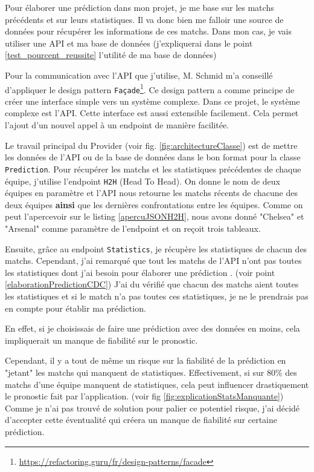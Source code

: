 \documentclass[a4paper,14pt]{extarticle}
\begin{document}
{Pour élaborer une prédiction dans mon projet, je me base sur les matchs précédents et sur leurs statistiques. Il va donc bien me falloir une source de données pour récupérer les informations de ces matchs. Dans mon cas, je vais utiliser une API et ma base de données (j'expliquerai dans le point \ref{test_pourcent_reussite} l'utilité de ma base de données)

Pour la communication avec l'API que j'utilise, M. Schmid m'a conseillé d'appliquer le design pattern \texttt{Façade}\footnote{\url{https://refactoring.guru/fr/design-patterns/facade}}. Ce design pattern a comme principe de créer une interface simple vers un système complexe. Dans ce projet, le système complexe est l'API. Cette interface est aussi extensible facilement. Cela permet l'ajout d'un nouvel appel à un endpoint de manière facilitée. 

Le travail principal du Provider (voir fig. \ref{fig:architectureClasse}) est de mettre les données de l'API ou de la base de données dans le bon format pour la classe \texttt{Prediction}.
Pour récupérer les matchs et les statistiques précédentes de chaque équipe, j'utilise l'endpoint \texttt{H2H} (Head To Head). On donne le nom de deux équipes en paramètre et l'API nous retourne les matchs récents de chacune des deux équipes \textbf{ainsi} que les dernières confrontations entre les équipes. 
Comme on peut l'apercevoir sur le listing \ref{apercuJSONH2H}, nous avons donné "Chelsea" et "Arsenal" comme paramètre de l'endpoint et on reçoit trois tableaux.

Ensuite, grâce au endpoint \texttt{Statistics}, je récupère les statistiques de chacun des matchs. Cependant, j'ai remarqué que tout les matchs de l'API n'ont pas toutes les statistiques dont j'ai besoin pour élaborer une prédiction . (voir point \ref{elaborationPredictionCDC}) J'ai du vérifié que chacun des matchs aient toutes les statistiques et si le match n'a pas toutes ces statistiques, je ne le prendrais pas en compte pour établir ma prédiction.

En effet, si je choisissais de faire une prédiction avec des données en moins, cela impliquerait un manque de fiabilité sur le pronostic. 

Cependant, il y a tout de même un risque sur la fiabilité de la prédiction en "jetant" les matchs qui manquent de statistiques. Effectivement, si sur 80\% des matchs d'une équipe manquent de statistiques, cela peut influencer drastiquement le pronostic fait par l'application. (voir fig \ref{fig:explicationStatsManquante}) Comme je n'ai pas trouvé de solution pour palier ce potentiel risque, j'ai décidé d'accepter cette éventualité qui créera un manque de fiabilité sur certaine prédiction.

}
\end{document}
